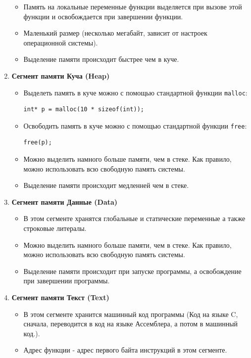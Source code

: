 \documentclass[10pt]{article}
\begin{document}
\begin{multicols}{2}
\begin{enumerate}
\begin{itemize}
\item Память на локальные переменные функции выделяется при вызове этой функции и освобождается при завершении функции.
\item Маленький размер (несколько мегабайт, зависит от настроек операционной системы).
\item Выделение памяти происходит быстрее чем в куче.
\end{itemize}
\item \textbf{Сегмент памяти Куча (Heap)} \\
\begin{itemize}
\item Выделеть память в куче можно с помощью стандартной функции \texttt{malloc}: \\
\begin{lstlisting}
int* p = malloc(10 * sizeof(int));
\end{lstlisting}
\item Освободить память в куче можно с помощью стандартной функции \texttt{free}:
\begin{lstlisting}
free(p);
\end{lstlisting}
\item Можно выделить намного больше памяти, чем в стеке.
Как правило, можно использовать всю свободную память системы.
\item Выделение памяти происходит медленней чем в стеке.
\end{itemize}
\end{enumerate}
\end{multicols}

\begin{enumerate}
\setcounter{enumi}{2}

\item \textbf{Сегмент памяти Данные (Data)}
\begin{itemize}
\item В этом сегменте хранятся глобальные и статические переменные а также строковые литералы.
\item Можно выделить намного больше памяти, чем в стеке.
Как правило, можно использовать всю свободную память системы.
\item Выделение памяти происходит при запуске программы, а освобождение при завершении программы.
\end{itemize}

\item \textbf{Сегмент памяти Текст (Text)}
\begin{itemize}
\item В этом сегменте хранится машинный код программы (Код на языке C, сначала, переводится в код на языке Ассемблера, а потом в машинный код.).
\item Адрес функции - адрес первого байта инструкций в этом сегменте.
\end{itemize}
\end{enumerate}
\end{document}
